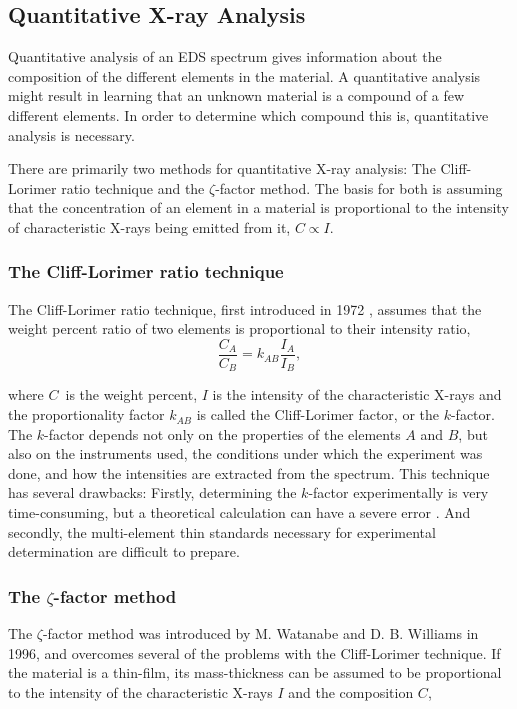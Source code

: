 	\subsection{Quantitative X-ray Analysis}
Quantitative analysis of an EDS spectrum gives information about the composition of the different elements in the material. A quantitative analysis might result in learning that an unknown material is a compound of a few different elements. In order to determine which compound this is, quantitative analysis is necessary.

There are primarily two methods for quantitative X-ray analysis: The Cliff-Lorimer ratio technique and the $\zeta$-factor method. The basis for both is assuming that the concentration of an element in a material is proportional to the intensity of characteristic X-rays being emitted from it, $C \propto I$.

		\subsubsection{The Cliff-Lorimer ratio technique}
The Cliff-Lorimer ratio technique, first introduced in 1972 \cite{cliff-lorimer}, assumes that the weight percent ratio of two elements is proportional to their intensity ratio,
\begin{equation}
\label{eq:CL-eq}
\frac{C_A}{C_B} = k_{AB}\frac{I_A}{I_B},
\end{equation}

where $C$ is the weight percent, $I$ is the intensity of the characteristic X-rays and the proportionality factor $k_{AB}$ is called the Cliff-Lorimer factor, or the $k$-factor. The $k$-factor depends not only on the properties of the elements $A$ and $B$, but also on the instruments used, the conditions under which the experiment was done, and how the intensities are extracted from the spectrum. This technique has several drawbacks: Firstly, determining the $k$-factor experimentally is very time-consuming, but a theoretical calculation can have a severe error \cite{williams-carter}. And secondly, the multi-element thin standards necessary for experimental determination are difficult to prepare.

		\subsubsection{The $\zeta$-factor method}
The $\zeta$-factor method was introduced by M. Watanabe and D. B. Williams in 1996, and overcomes several of the problems with the Cliff-Lorimer technique. If the material is a thin-film, its mass-thickness can be assumed to be proportional to the intensity of the characteristic X-rays $I$ and the composition $C$,

